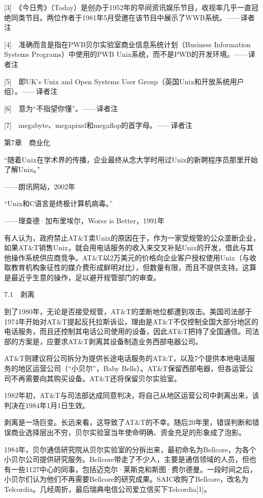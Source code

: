 \documentclass[a4paper,12pt,UTF8,twoside]{ctexbook}
\begin{document}
[3]　《今日秀》（Today）是创办于1952年的早间资讯娱乐节目，收视率几乎一直冠绝同类节目。两位作者于1981年5月受邀在该节目中展示了WWB系统。——译者注

[4]　准确而言是指在PWB贝尔实验室商业信息系统计划（Business Information Systems Programs）中使用的PWB Unix系统，而不是PWB的开发环境。——译者注

[5]　即UK’s Unix and Open Systems User Group（英国Unix和开放系统用户组）。——译者注

[6]　意为“不指望你懂”。——译者注

[7]　megabyte、megapixel和megaflop的首字母。——译者注





第7章　商业化


“随着Unix在学术界的传播，企业最终从念大学时用过Unix的新聘程序员那里开始了解Unix。”

——朗讯网站，2002年

“Unix和C语言是终极计算机病毒。”

——理查德·加布里埃尔，Worse is Better，1991年

有人认为，政府禁止AT\&T卖Unix的原因在于，作为一家受规管的公众垄断企业，如果AT\&T销售Unix，就会用电话服务的收入来交叉补贴Unix的开发，借此与其他操作系统供应商竞争。AT\&T以2万美元的价格向企业客户授权使用Unix（与收取教育机构象征性的媒介费形成鲜明对比），但数量有限，而且不提供支持。这算是最近乎生意的操作，足以避开规管部门的审查。





7.1　剥离


到了1980年，无论是否接受规管，AT\&T的垄断地位都遭到攻击。美国司法部于1974年开始对AT\&T提起反托拉斯诉讼，理由是AT\&T不仅控制全国大部分地区的电话服务，而且还控制其电话公司使用的设备，因此AT\&T把持了全国通信。司法部的方案是，应要求AT\&T剥离其设备制造业务西部电器公司。

AT\&T则建议将公司拆分为提供长途电话服务的AT\&T，以及7个提供本地电话服务的地区运营公司（“小贝尔”，Baby Bells）。AT\&T保留西部电器，但各运营公司不再需要向其购买设备。AT\&T还将保留贝尔实验室。

1982年初，AT\&T与司法部达成同意判决，将自己从地区运营公司中剥离出来，该判决在1984年1月1日生效。

剥离是一场巨变。长远来看，这导致了AT\&T的不幸。随后20年里，错误判断和错误商业选择层出不穷，贝尔实验室当年使命明确、资金充足的形象成了泡影。

1984年，贝尔通信研究院从贝尔实验室的分拆出来，最初命名为Bellcore，为各个小贝尔公司提供研究服务。Bellcore带走了不少人，主要是通信领域的人员，但也有一些1127中心的同事，包括迈克尔·莱斯克和斯图·费尔德曼。一段时间之后，小贝尔们认为他们不再需要Bellcore的研究成果。SAIC收购了Bellcore，改名为Telcordia。几经周折，最后瑞典电信公司爱立信买下Telcordia[1]。
\end{document}
